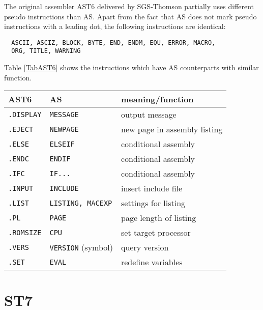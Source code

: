 \documentclass[12pt,twoside]{report}
\newcommand{\tty}[1]{{\tt #1}}
\begin{document}
The original assembler AST6 delivered by SGS-Thomson partially uses
different pseudo instructions than AS.  Apart from the fact that AS
does not mark pseudo instructions with a leading dot, the following
instructions are identical:
\begin{verbatim}
  ASCII, ASCIZ, BLOCK, BYTE, END, ENDM, EQU, ERROR, MACRO,
  ORG, TITLE, WARNING 
\end{verbatim}
Table \ref{TabAST6} shows the instructions which have AS counterparts
with similar function.
\par
\begin{table*}[htbp]
\begin{center}\begin{tabular}{|l|l|l|}                      
\hline
AST6            & AS                     & meaning/function \\
\hline
\hline
\tty{.DISPLAY}  & \tty{MESSAGE}          & output message \\
\hline
\tty{.EJECT}    & \tty{NEWPAGE}          & new page in assembly listing \\
\hline
\tty{.ELSE}     & \tty{ELSEIF}           & conditional assembly \\
\hline
\tty{.ENDC}     & \tty{ENDIF}            & conditional assembly \\
\hline
\tty{.IFC}      & \tty{IF...}            & conditional assembly \\
\hline
\tty{.INPUT}    & \tty{INCLUDE}          & insert include file \\
\hline
\tty{.LIST}     & \tty{LISTING, MACEXP}  & settings for listing \\
\hline
\tty{.PL}       & \tty{PAGE}             & page length of listing \\
\hline
\tty{.ROMSIZE}  & \tty{CPU}              & set target processor \\
\hline
\tty{.VERS}     & \tty{VERSION} (symbol) & query version \\
\hline
\tty{.SET}      & \tty{EVAL}             & redefine variables \\
\hline
\end{tabular}\end{center}                                   
\caption{Equivalent Instructions AST6$\leftrightarrow$AS\label{TabAST6}}
\end{table*}


\section{ST7}
\end{document}

